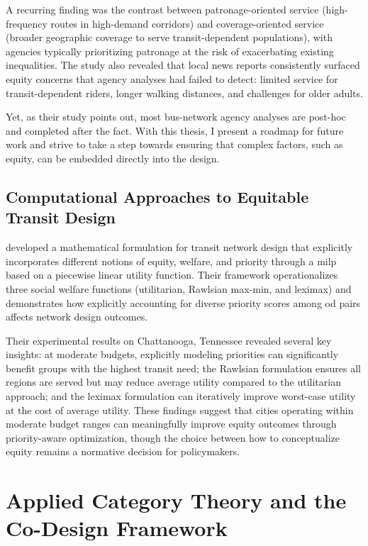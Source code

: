 A recurring finding was the contrast between patronage-oriented service (high-frequency routes in high-demand corridors) and coverage-oriented service (broader geographic coverage to serve transit-dependent populations), with agencies typically prioritizing patronage at the risk of exacerbating existing inequalities. The study also revealed that local news reports consistently surfaced equity concerns that agency analyses had failed to detect: limited service for transit-dependent riders, longer walking distances, and challenges for older adults.

Yet, as their study points out, most bus-network agency analyses are post-hoc and completed after the fact. With this thesis, I present a roadmap for future work and strive to take a step towards ensuring that complex factors, such as equity, can be embedded directly into the design.

\subsection{Computational Approaches to Equitable Transit Design}

\textcite{paviaDesigningEquitableTransit2023} developed a mathematical formulation for transit network design that explicitly incorporates different notions of equity, welfare, and priority through a \gls{milp} based on a piecewise linear utility function. Their framework operationalizes three social welfare functions (utilitarian, Rawlsian max-min, and leximax) and demonstrates how explicitly accounting for diverse priority scores among \gls{od} pairs affects network design outcomes.

Their experimental results on Chattanooga, Tennessee revealed several key insights: at moderate budgets, explicitly modeling priorities can significantly benefit groups with the highest transit need; the Rawlsian formulation ensures all regions are served but may reduce average utility compared to the utilitarian approach; and the leximax formulation can iteratively improve worst-case utility at the cost of average utility. These findings suggest that cities operating within moderate budget ranges can meaningfully improve equity outcomes through priority-aware optimization, though the choice between how to conceptualize equity remains a normative decision for policymakers.

\section{Applied Category Theory and the Co-Design Framework}
